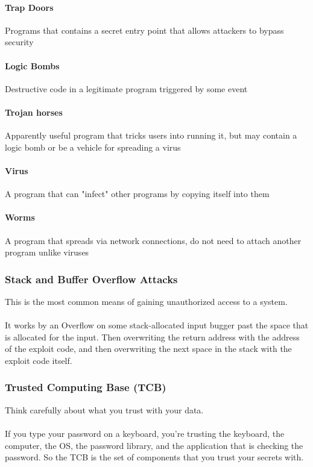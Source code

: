 \documentclass{article}
\begin{document}
\paragraph{Trap Doors} Programs that contains a secret entry point that allows attackers to bypass security
\paragraph{Logic Bombs} Destructive code in a legitimate program triggered by some event
\paragraph{Trojan horses} Apparently useful program that tricks users into running it, but may contain a logic bomb or be a vehicle for spreading a virus
\paragraph{Virus} A program that can "infect" other programs by copying itself into them
\paragraph{Worms} A program that spreads via network connections, do not need to attach another program unlike viruses

\subsubsection{Stack and Buffer Overflow Attacks}

This is the most common means of gaining unauthorized access to a system.
\\
\\
It works by an Overflow on some stack-allocated input bugger past the space that is allocated for the input. Then overwriting the return address with the address of the exploit code, and then overwriting the next space in the stack with the exploit code itself.

\subsubsection{Trusted Computing Base (TCB)}

Think carefully about what you trust with your data.
\\
\\
If you type your password on a keyboard, you're trusting the keyboard, the computer, the OS, the password library, and the application that is checking the password. So the TCB is the set of components that you trust your secrets with.
\end{document}
